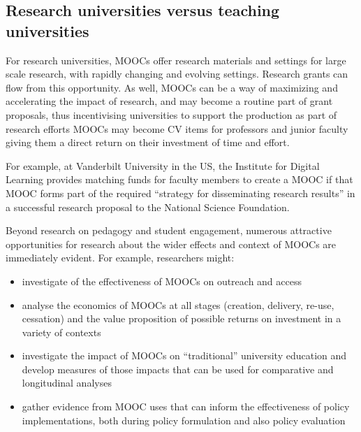 \subsection{Research universities versus teaching universities}

For research universities, MOOCs offer research materials and settings
for large scale research, with rapidly changing and evolving
settings. Research grants can flow from this opportunity.
As well, MOOCs can be a way of maximizing and accelerating the impact of
research, and may become a routine part of grant proposals, thus
incentivising universities to support the production as part of research
efforts MOOCs may become CV items for professors and junior faculty
giving them a direct return on their investment of time and effort.


For example, at Vanderbilt University in the US, the Institute for
Digital Learning provides matching funds for faculty members to create a
MOOC if that MOOC forms part of the required ``strategy for disseminating
research results'' in a successful research proposal to the National
Science Foundation.

Beyond research on pedagogy and student engagement, numerous attractive
opportunities for research about the wider effects and context of MOOCs
are immediately evident.  For example, researchers might:

\begin{itemize}

\item investigate of the effectiveness of
MOOCs on outreach and access 

\item analyse the economics of MOOCs at all stages (creation, delivery,
re-use, cessation) and the value proposition of possible returns on
investment in a variety of contexts  

\item investigate the impact of MOOCs on
``traditional'' university education and develop measures of those impacts
that can be used for comparative and longitudinal analyses 

\item gather
evidence from MOOC uses that can inform the effectiveness of policy
implementations, both during policy formulation and also policy
evaluation

\end{itemize}

